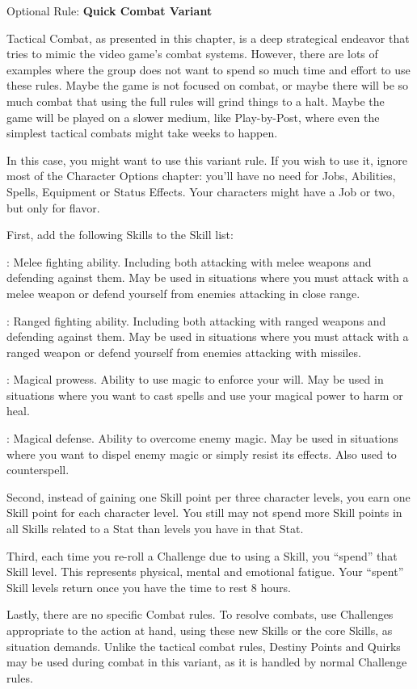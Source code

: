 \begin{multiboco}
Optional Rule: \textbf{Quick Combat Variant}\pc%

Tactical Combat, as presented in this chapter, is a deep strategical endeavor that tries to mimic the video game's combat systems. However, there are lots of examples where the group does not want to spend so much time and effort to use these rules. Maybe the game is not focused on combat, or maybe there will be so much combat that using the full rules will grind things to a halt. Maybe the game will be played on a slower medium, like Play-by-Post, where even the simplest tactical combats might take weeks to happen.

In this case, you might want to use this variant rule. If you wish to use it, ignore most of the Character Options chapter: you'll have no need for Jobs, Abilities, Spells, Equipment or Status Effects. Your characters might have a Job or two, but only for flavor.

First, add the following Skills to the Skill list:

: Melee fighting ability. Including both attacking with melee weapons and defending against them. May be used in situations where you must attack with a melee weapon or defend yourself from enemies attacking in close range.

: Ranged fighting ability. Including both attacking with ranged weapons and defending against them. May be used in situations where you must attack with a ranged weapon or defend yourself from enemies attacking with missiles.

: Magical prowess. Ability to use magic to enforce your will. May be used in situations where you want to cast spells and use your magical power to harm or heal.

: Magical defense. Ability to overcome enemy magic. May be used in situations where you want to dispel enemy magic or simply resist its effects. Also used to counterspell.

Second, instead of gaining one Skill point per three character levels, you earn one Skill point for each character level. You still may not spend more Skill points in all Skills related to a Stat than levels you have in that Stat.

Third, each time you re-roll a Challenge due to using a Skill, you “spend” that Skill level. This represents physical, mental and emotional fatigue. Your “spent” Skill levels return once you have the time to rest 8 hours.

Lastly, there are no specific Combat rules. To resolve combats, use Challenges appropriate to the action at hand, using these new Skills or the core Skills, as situation demands. Unlike the tactical combat rules, Destiny Points and Quirks may be used during combat in this variant, as it is handled by normal Challenge rules.
\end{multiboco}

